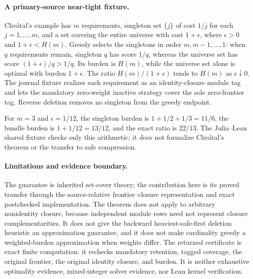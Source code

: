 \paragraph{A primary-source near-tight fixture.}
Chv\'atal's example has $m$ requirements, singleton set $\{j\}$ of cost
$1/j$ for each $j=1,\ldots,m$, and a set covering the entire universe with
cost $1+\epsilon$, where $\epsilon>0$ and
$1+\epsilon<H(m)$.  Greedy selects the singletons in order
$m,m-1,\ldots,1$: when $q$ requirements remain, singleton $q$ has score
$1/q$, whereas the universe set has score $(1+\epsilon)/q>1/q$.  Its burden
is $H(m)$, while the universe set alone is optimal with burden
$1+\epsilon$.  The ratio $H(m)/(1+\epsilon)$ tends to $H(m)$ as
$\epsilon\downarrow0$.  The journal fixture realizes each requirement as an
identity-closure module tag and lets the mandatory zero-weight inactive
strategy cover the sole zero-frontier tag.  Reverse deletion removes no
singleton from the greedy endpoint.

\begin{example}
\label{ex:aor-greedy-shared-formal-fixture}
For \(m=3\) and \(\epsilon=1/12\), the singleton burden is
\(1+1/2+1/3=11/6\), the bundle burden is \(1+1/12=13/12\), and the exact
ratio is \(22/13\).  The Julia--Lean shared fixture checks only this arithmetic;
it does not formalize Chv\'atal's theorem or the transfer to safe compression.
\end{example}

\paragraph{Limitations and evidence boundary.}
The guarantee is inherited set-cover theory; the contribution here is its
proved transfer through the source-relative frontier--closure representation
and exact postchecked implementation.  The theorem does not apply to
arbitrary nonidentity closure, because independent module rows need not
represent closure complementarities.  It does not give the backward
heaviest-safe-first deletion heuristic an approximation guarantee, and it
does not make cardinality greedy a weighted-burden approximation when weights
differ.  The returned certificate is exact finite computation: it rechecks
mandatory retention, tagged coverage, the original frontier, the original
identity closure, and burden.  It is neither exhaustive optimality evidence,
mixed-integer solver evidence, nor Lean kernel verification.
